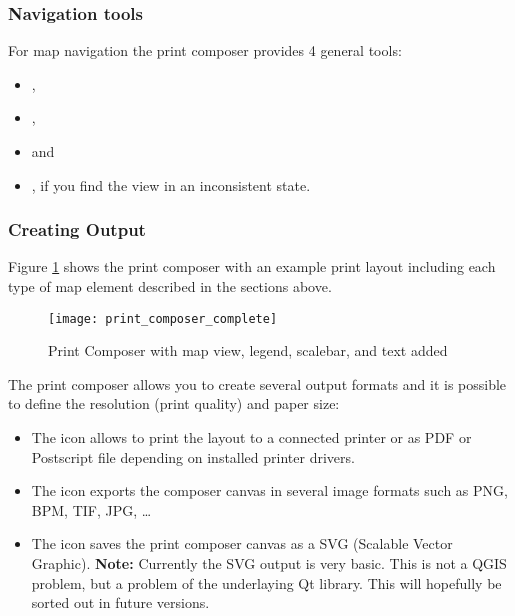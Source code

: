 \subsubsection{Navigation tools}

For map navigation the print composer provides 4 general tools:

\begin{itemize}
\item {},
\item {},
\item {} and
\item {}, if you find the view in an inconsistent state. 
\end{itemize}

\subsubsection{Creating Output}

Figure \ref{fig:print_composer_complete} shows the print composer with an example 
print layout including each type of map element described in the sections above.

\begin{figure}[h]
   \begin{center}
   \caption{Print Composer with map view, legend, scalebar, and text added \nixcaption}
   \label{fig:print_composer_complete}\smallskip
   \texttt{[image: print\_composer\_complete]}
\end{center}  
\end{figure}

The print composer allows you to create several output formats and it is possible to 
define the resolution (print quality) and paper size:

\begin{itemize}
\item The  icon allows to print the layout 
to a connected printer or as PDF or Postscript file depending on installed printer 
drivers.
\item The  icon exports the 
composer canvas in several image formats such as PNG, BPM, TIF, JPG, \dots
\item The  icon saves the print 
composer canvas as a SVG (Scalable Vector Graphic). \textbf{Note:} Currently the 
SVG output is very basic. This is not a QGIS problem, but a problem of the underlaying 
Qt library. This will hopefully be sorted out in future versions.
\end{itemize}

